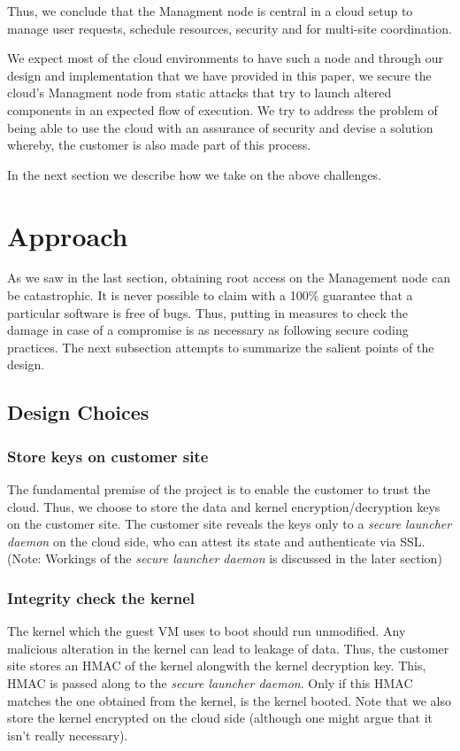 \documentclass[10pt,twocolumn,pdftex]{article}
\begin{document}
Thus, we conclude that the Managment node is central in a cloud setup to manage user requests, schedule resources, security and for multi-site coordination.

We expect most of the cloud environments to have such a node and through our design and implementation that we have provided in this paper, we secure the cloud's Managment node from static attacks that try to launch altered components in an expected flow of execution. We try to address the problem of being able to use the cloud with an assurance of security and devise a solution whereby, the customer is also made part of this process.

In the next section we describe how we take on the above challenges.

\section{Approach}
\label{sec:approach}
As we saw in the last section, obtaining root access on the Management node can be catastrophic. It is never possible to claim with a 100\% guarantee that a particular software is free of bugs. Thus, putting in measures to check the damage in case of a compromise is as necessary as following secure coding practices. The next subsection attempts to summarize the salient points of the design. 

\subsection{Design Choices}

\subsubsection{Store keys on customer site}
The fundamental premise of the project is to enable the customer to trust the cloud. Thus, we choose to store the data and kernel encryption/decryption keys on the customer site. The customer site reveals the keys only to a \emph{secure launcher daemon} on the cloud side, who can attest its state and authenticate via SSL. (Note: Workings of the \emph{secure launcher daemon} is discussed in the later section)

\subsubsection{Integrity check the kernel}
The kernel which the guest VM uses to boot should run unmodified. Any malicious alteration in the kernel can lead to leakage of data. Thus, the customer site stores an HMAC of the kernel alongwith the kernel decryption key. This, HMAC is passed along to the \emph{secure launcher daemon}. Only if this HMAC matches the one obtained from the kernel, is the kernel booted. Note that we also store the kernel encrypted on the cloud side (although one might argue that it isn't really necessary).
\end{document}
